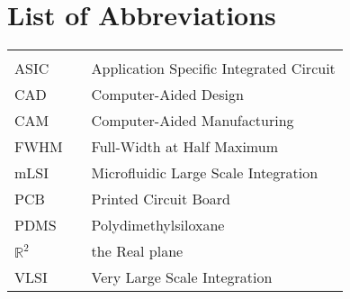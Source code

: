 \chapter*{List of Abbreviations}
\begin{center}
  \begin{tabular}{lll}
    \hspace*{2em} & \hspace*{1in} & \hspace*{4.5in} \\
    ASIC & \dotfill & Application Specific Integrated Circuit \\
    CAD  & \dotfill & Computer-Aided Design \\
    CAM  & \dotfill & Computer-Aided Manufacturing \\
    FWHM & \dotfill & Full-Width at Half Maximum \\
    mLSI & \dotfill & Microfluidic Large Scale Integration \\
    PCB  & \dotfill & Printed Circuit Board \\
    PDMS & \dotfill & Polydimethylsiloxane \\
    $\mathbb{R}^{2}$  & \dotfill & the Real plane \\
    VLSI & \dotfill & Very Large Scale Integration \\
  \end{tabular}
\end{center}
\cleardoublepage


\newpage
\endofprelim
